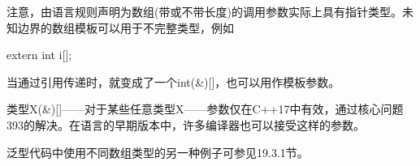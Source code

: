 注意，由语言规则声明为数组(带或不带长度)的调用参数实际上具有指针类型。未知边界的数组模板可以用于不完整类型，例如

\begin{cpp}
extern int i[];
\end{cpp}

当通过引用传递时，就变成了一个int(\&)[]，也可以用作模板参数。

\begin{notice}
类型X(\&)[]——对于某些任意类型X——参数仅在C++17中有效，通过核心问题393的解决。在语言的早期版本中，许多编译器也可以接受这样的参数。
\end{notice}

泛型代码中使用不同数组类型的另一种例子可参见19.3.1节。

















